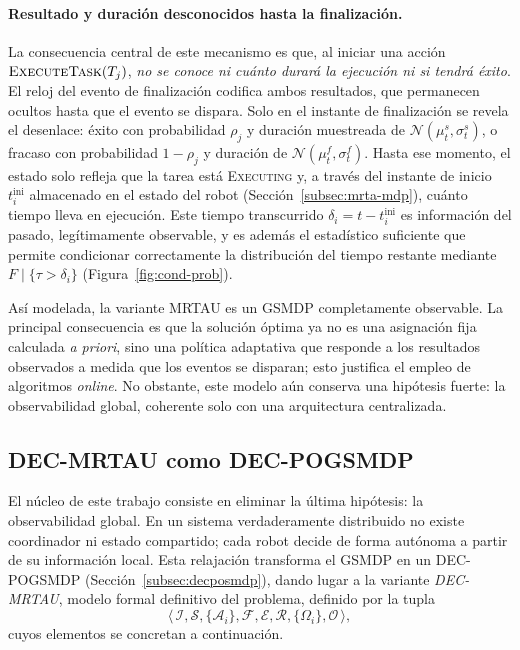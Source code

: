 \paragraph{Resultado y duración desconocidos hasta la finalización.} La consecuencia central de este mecanismo es que, al iniciar una acción $\textsc{ExecuteTask}(T_j)$, \emph{no se conoce ni cuánto durará la ejecución ni si tendrá éxito}. El reloj del evento de finalización codifica ambos resultados, que permanecen ocultos hasta que el evento se dispara. Solo en el instante de finalización se revela el desenlace: éxito con probabilidad $\rho_j$ y duración muestreada de $\mathcal{N}(\mu_t^s,\sigma_t^s)$, o fracaso con probabilidad $1-\rho_j$ y duración de $\mathcal{N}(\mu_t^f,\sigma_t^f)$. Hasta ese momento, el estado solo refleja que la tarea está \textsc{Executing} y, a través del instante de inicio $t^{\mathrm{ini}}_i$ almacenado en el estado del robot (Sección~\ref{subsec:mrta-mdp}), cuánto tiempo lleva en ejecución. Este tiempo transcurrido $\delta_i = t - t^{\mathrm{ini}}_i$ es información del pasado, legítimamente observable, y es además el estadístico suficiente que permite condicionar correctamente la distribución del tiempo restante mediante $F\mid\{\tau>\delta_i\}$ (Figura~\ref{fig:cond-prob}).
 
Así modelada, la variante MRTAU es un GSMDP completamente observable. La principal consecuencia es que la solución óptima ya no es una asignación fija calculada \textit{a priori}, sino una política adaptativa que responde a los resultados observados a medida que los eventos se disparan; esto justifica el empleo de algoritmos \textit{online}. No obstante, este modelo aún conserva una hipótesis fuerte: la observabilidad global, coherente solo con una arquitectura centralizada.


\subsection{DEC-MRTAU como DEC-POGSMDP} \label{subsec:decmrtau-decpogsmdp} %
 
El núcleo de este trabajo consiste en eliminar la última hipótesis: la observabilidad global. En un sistema verdaderamente distribuido no existe coordinador ni estado compartido; cada robot decide de forma autónoma a partir de su información local. Esta relajación transforma el GSMDP en un DEC-POGSMDP (Sección~\ref{subsec:decposmdp}), dando lugar a la variante \emph{DEC-MRTAU}, modelo formal definitivo del problema, definido por la tupla \begin{equation} \label{eq:tupla-decpogsmdp} \big\langle\,\mathcal{I},\mathcal{S},\{\mathcal{A}_i\}, \mathcal{F}, \mathcal{E},\mathcal{R}, \{\Omega_i\},\mathcal{O}\,\big\rangle, \end{equation} cuyos elementos se concretan a continuación.
 
